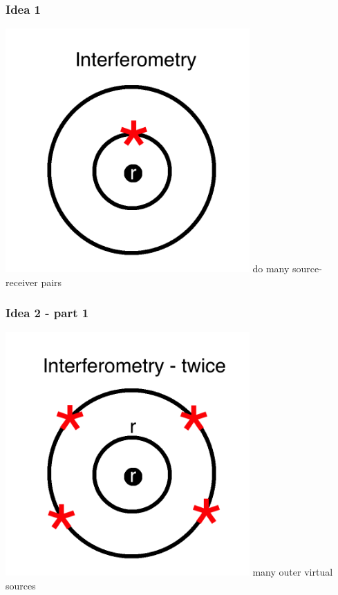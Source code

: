 \documentclass{beamer}
\begin{document}
\frame
{
\frametitle{{\bf Idea 1}}
\centering
\includegraphics[width=0.7\textwidth]{../pics/idea/onyva.png}
\vfill
do many source-receiver pairs
}
\frame
{
\frametitle{{\bf Idea 2 - part 1}}
\centering
\includegraphics[width=0.7\textwidth]{../pics/idea/vamos-1.png}
\vfill
many outer virtual sources
}
\end{document}
